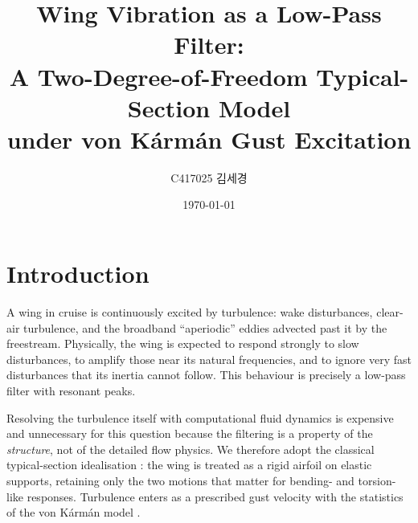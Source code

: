 \documentclass[11pt]{article}
\title{\textbf{Wing Vibration as a Low-Pass Filter:\\
A Two-Degree-of-Freedom Typical-Section Model\\
under von K\'arm\'an Gust Excitation}}
\author{C417025 김세경}
\date{\today}
\begin{document}
\maketitle

\section{Introduction}
A wing in cruise is continuously excited by turbulence: wake disturbances,
clear-air turbulence, and the broadband ``aperiodic'' eddies advected past it
by the freestream. Physically, the wing is expected to respond strongly to slow
disturbances, to amplify those near its natural frequencies, and to ignore very
fast disturbances that its inertia cannot follow. This behaviour is precisely a
low-pass filter with resonant peaks.

Resolving the turbulence itself with computational fluid dynamics is expensive
and unnecessary for this question because the filtering is a property of the
\emph{structure}, not of the detailed flow physics. We therefore adopt the
classical typical-section idealisation \cite{hodges2011,fung1955}: the wing is treated
as a rigid airfoil on elastic supports, retaining only the two motions that
matter for bending- and torsion-like responses. Turbulence enters as a
prescribed gust velocity with the statistics of the von K\'arm\'an model
\cite{vonkarman1948}.
\end{document}
